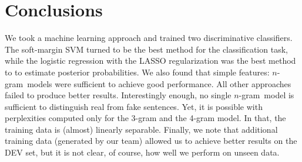 \documentclass[11pt]{article}
\newcommand{\ngram}{\mbox{$n$-gram }}
\begin{document}
\section{Conclusions}
We took a machine learning approach and trained two discriminative classifiers. 
The soft-margin SVM turned to be the best method for the classification task,
while the logistic regression with the LASSO regularization was
the best method to to estimate posterior probabilities.
We also found that simple features: \ngram models were sufficient to achieve good performance.
All other approaches failed to produce better results.
Interestingly enough, no single \ngram model is sufficient to distinguish real from fake sentences.
Yet, it is possible with perplexities computed only for the 3-gram and the 4-gram model. In that,
the training data is (almost) linearly separable.
Finally, we note that additional training data (generated by our team) allowed us to achieve better 
results on the DEV set, but it is not clear, of course, how well we perform on unseen data.



\end{document}
